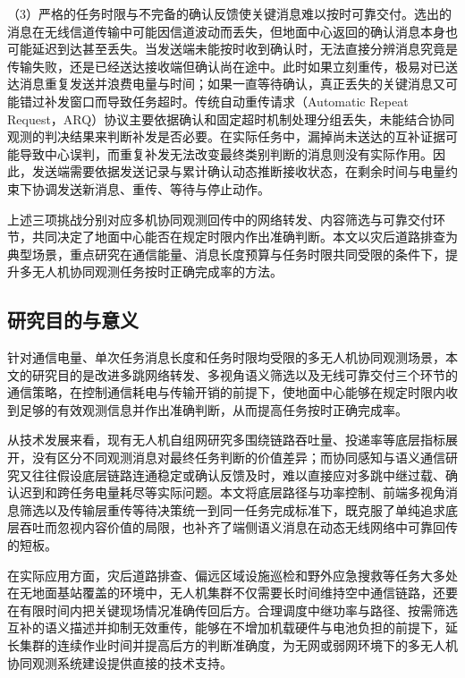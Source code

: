 （3）严格的任务时限与不完备的确认反馈使关键消息难以按时可靠交付。选出的消息在无线信道传输中可能因信道波动而丢失，但地面中心返回的确认消息本身也可能延迟到达甚至丢失。当发送端未能按时收到确认时，无法直接分辨消息究竟是传输失败，还是已经送达接收端但确认尚在途中。此时如果立刻重传，极易对已送达消息重复发送并浪费电量与时间；如果一直等待确认，真正丢失的关键消息又可能错过补发窗口而导致任务超时。传统自动重传请求（Automatic Repeat Request，ARQ）协议主要依据确认和固定超时机制处理分组丢失\cite{lin1984arq}，未能结合协同观测的判决结果来判断补发是否必要。在实际任务中，漏掉尚未送达的互补证据可能导致中心误判，而重复补发无法改变最终类别判断的消息则没有实际作用。因此，发送端需要依据发送记录与累计确认动态推断接收状态，在剩余时间与电量约束下协调发送新消息、重传、等待与停止动作。

上述三项挑战分别对应多机协同观测回传中的网络转发、内容筛选与可靠交付环节，共同决定了地面中心能否在规定时限内作出准确判断。本文以灾后道路排查为典型场景，重点研究在通信能量、消息长度预算与任务时限共同受限的条件下，提升多无人机协同观测任务按时正确完成率的方法。

\subsection{研究目的与意义}

针对通信电量、单次任务消息长度和任务时限均受限的多无人机协同观测场景，本文的研究目的是改进多跳网络转发、多视角语义筛选以及无线可靠交付三个环节的通信策略，在控制通信耗电与传输开销的前提下，使地面中心能够在规定时限内收到足够的有效观测信息并作出准确判断，从而提高任务按时正确完成率。

从技术发展来看，现有无人机自组网研究多围绕链路吞吐量、投递率等底层指标展开，没有区分不同观测消息对最终任务判断的价值差异；而协同感知与语义通信研究又往往假设底层链路连通稳定或确认反馈及时，难以直接应对多跳中继过载、确认迟到和跨任务电量耗尽等实际问题。本文将底层路径与功率控制、前端多视角消息筛选以及传输层重传等待决策统一到同一任务完成标准下，既克服了单纯追求底层吞吐而忽视内容价值的局限，也补齐了端侧语义消息在动态无线网络中可靠回传的短板。

在实际应用方面，灾后道路排查、偏远区域设施巡检和野外应急搜救等任务大多处在无地面基站覆盖的环境中，无人机集群不仅需要长时间维持空中通信链路，还要在有限时间内把关键现场情况准确传回后方。合理调度中继功率与路径、按需筛选互补的语义描述并抑制无效重传，能够在不增加机载硬件与电池负担的前提下，延长集群的连续作业时间并提高后方的判断准确度，为无网或弱网环境下的多无人机协同观测系统建设提供直接的技术支持。



